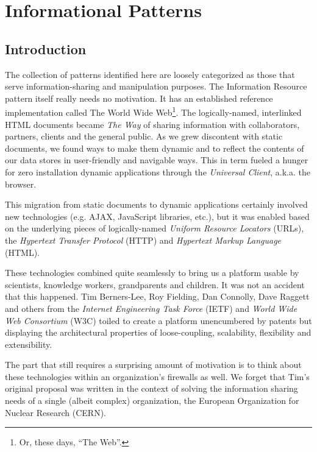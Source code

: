\chapter{Informational Patterns}
\label{ch01}

\section{Introduction}
\label{ch01.sec.1}

The collection of patterns identified here are loosely categorized as those that serve information-sharing and manipulation purposes. The Information Resource pattern itself really needs no motivation. It has an established reference implementation called The World Wide Web\footnote{Or, these days, ``The Web''.}. The logically-named, interlinked HTML documents became \emph{The Way} of sharing information with collaborators, partners, clients and the general public. As we grew discontent with static documents, we found ways to make them dynamic and to reflect the contents of our data stores in user-friendly and navigable ways. This in term fueled a hunger for zero installation dynamic applications through the \emph{Universal Client}, a.k.a. the browser.

This migration from static documents to dynamic applications certainly involved new technologies (e.g. AJAX, JavaScript libraries, etc.), but it was enabled based on the underlying pieces of logically-named \emph{Uniform Resource Locators} (URLs), the \emph{Hypertext Transfer Protocol} (HTTP) and \emph{Hypertext Markup Language} (HTML).

These technologies combined quite seamlessly to bring us a platform usable by scientists, knowledge workers, grandparents and children. It was not an accident that this happened. Tim Berners-Lee, Roy Fielding, Dan Connolly, Dave Raggett and others from the \emph{Internet Engineering Task Force} (IETF) and \emph{World Wide Web Consortium} (W3C) toiled to create a platform unencumbered by patents but displaying the architectural properties of loose-coupling, scalability, flexibility and extensibility.

The part that still requires a surprising amount of motivation is to think about these technologies within an organization's firewalls as well. We forget that Tim's original proposal was written in the context of solving the information sharing needs of a single (albeit complex) organization, the European Organization for Nuclear Research (CERN).


